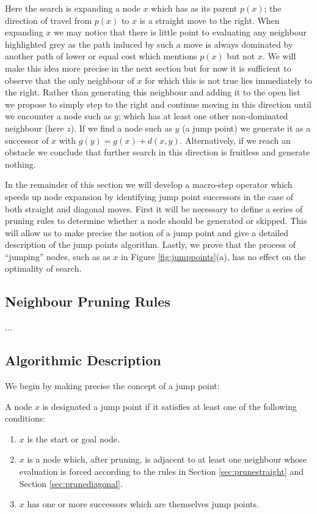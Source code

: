 Here the search is expanding a node $x$ which has as its parent $p(x)$;
the direction of travel from $p(x)$ to $x$ is a straight move to the right.
When expanding $x$ we may notice that there is little point to evaluating any
neighbour highlighted grey as the path induced by such a move is always dominated 
by another path of lower or equal cost which mentions $p(x)$ but not $x$.
We will make this idea more precise in the next section but for now it is 
sufficient to observe that the only neighbour of $x$ for which this is not 
true lies immediately to the right.
Rather than generating this neighbour and adding it to the open list we propose 
to simply step to the right and continue moving in this direction until we
encounter a node such as $y$; which has at least one other non-dominated
neighbour (here $z$). 
If we find a node such as $y$ (a jump point) we generate it as a successor 
of $x$ with $g(y) = g(x) + d(x, y)$.
Alternatively, if we reach an obstacle we conclude that further search in this
direction is fruitless and generate nothing.
\par
In the remainder of this section we will develop a macro-step operator which 
speeds up node expansion by identifying jump point successors in the case of
both straight and diagonal moves. First it will be necessary to define a series of
pruning rules to determine whether a node should be generated 
or skipped. 
This will allow us to make precise the notion of a jump point and 
give a detailed description of the jump points algorithm.
Lastly, we prove that the process of ``jumping'' nodes, such as as $x$ in 
Figure \ref{fig:jumppoints}(a), has no effect on the optimality of search.

\subsection{Neighbour Pruning Rules} 
$\ldots$
\subsection{Algorithmic Description}
We begin by making precise the concept of a jump point:

\begin{definition}
\label{def:jump}
A node $x$ is designated a jump point if it satisfies at least one of the following
conditions:
\begin{enumerate}
\item{$x$ is the start or goal node.}
\item{$x$ is a node which, after pruning, is adjacent to at least one neighbour
whose evaluation is forced according to the rules in Section
\ref{sec:prunestraight} and Section \ref{sec:prunediagonal}.}
\item{$x$ has one or more successors which are themselves jump points.}
\end{enumerate}
\end{definition}

